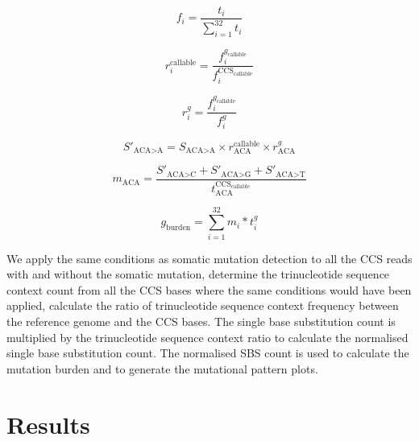 \begin{equation}
f_{i} = \frac{t_{i}}{\sum^{32}_{i=1} t_{i}}
\end{equation}

\begin{equation}
r^{\text{callable}}_{i} = \frac{f^{g_{\text{callable}}}_{i}}{f^{\text{CCS}_{\text{callable}}}_{i}}
\end{equation}

\begin{equation}
r^{g}_{i} = \frac{f^{g_{\text{callable}}}_{i}}{f^{g}_{i}}
\end{equation}

\begin{equation}
S'_{\text{ACA>A}} = S_{\text{ACA>A}} \times r^{\text{callable}}_{\text{ACA}} \times r^{g}_{\text{ACA}}
\end{equation}

\begin{equation}
m_{\text{ACA}} = \frac{S'_{\text{ACA>C}} + S'_{\text{ACA>G}} + S'_{\text{ACA>T}}}{t^{\text{CCS}_{\text{callable}}}_{\text{ACA}}} 
\end{equation}

\begin{equation}
g_{\text{burden}} = \sum^{32}_{i=1} m_{i} * t^{g}_{i}
\end{equation}




We apply the same conditions as somatic mutation detection to all the CCS reads with and without the somatic mutation, determine the trinucleotide sequence context count from all the CCS bases where the same conditions would have been applied, calculate the ratio of trinucleotide sequence context frequency between the reference genome and the CCS bases. The single base substitution count is multiplied by the trinucleotide sequence context ratio to calculate the normalised single base substitution count. The normalised SBS count is used to calculate the mutation burden and to generate the mutational pattern plots. 



\section{Results}


